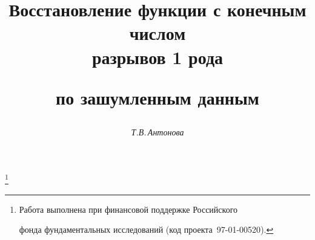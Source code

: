 




%


\newcommand{\Mod}[1]{\left| #1 \right |}


\newcommand{\norm}[1]{\left\| #1 \right\|}


\newcommand{\sign}{\operatorname{sign}}


\newcommand{\tts}[1]{}







\setcounter{page}{65}















\author{\it Т.В.\,Антонова}




\title{Восстановление функции с конечным числом\\ разрывов 1 рода


по зашумленным данным}


\thanks{Работа выполнена при финансовой поддержке Российского


фонда фундаментальных исследований (код проекта \No\,{97-01-00520}).}





\date{}




\pagestyle{plain} %





